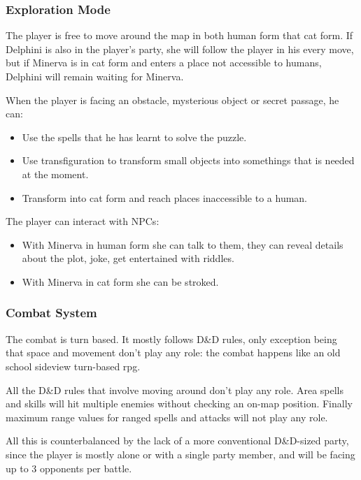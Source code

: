 
\subsubsection{Exploration Mode}

The player is free to move around  the map in both human form that cat form. If Delphini is also in the player's party, she will follow the player in his every move, but if Minerva is in cat form and enters a place not accessible to humans, Delphini will remain waiting for Minerva. 

When the player is facing an obstacle, mysterious object or secret passage, he can: 

\begin{itemize}
    \item Use the spells that he has learnt to solve the puzzle.
    \item Use transfiguration to transform small objects into somethings that is needed at the moment.
    \item Transform into cat form and reach places inaccessible to a human.
\end{itemize}

The player can interact with NPCs:

\begin{itemize}
    \item With Minerva in human form she can talk to them, they can reveal details about the plot, joke, get entertained with riddles.
    \item With Minerva in cat form she can be stroked.
\end{itemize}


\pagebreak 

\subsubsection{Combat System}
The combat is turn based. It mostly follows D\&D rules, only exception being that space and movement don't play any role: the combat happens like an old school sideview turn-based rpg. 

All the D\&D rules that involve moving around don't play any role. Area spells and skills will hit multiple enemies without checking an on-map position. Finally maximum range values for ranged spells and attacks will not play any role. 

All this is counterbalanced by the lack of a more conventional D\&D-sized party, since the player is mostly alone or with a single party member, and will be facing up to 3 opponents per battle.


